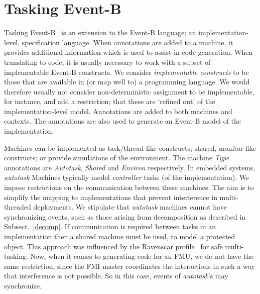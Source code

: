\documentclass{llncs}%
\begin{document}
\section{Tasking Event-B}\label{TEB}
Tasking Event-B~\cite{ae2011a} is an extension to the Event-B language; an implementation-level, specification language. When annotations are added to a machine, it provides additional information which is used to assist in code generation. When translating to code, it is usually necessary to work with a subset of implementable Event-B constructs. We consider \emph{implementable constructs} to be those that are available in (or map well to) a programming language. We would therefore usually not consider non-deterministic assignment to be implementable, for instance, and add a restriction; that these are `refined out' of the implementation-level model. Annotations are added to both machines and contexts. The annotations are also used to generate an Event-B model of the implementation. 

Machines can be implemented as task/thread-like constructs; shared, monitor-like constructs; or provide simulations of the environment.  The machine \emph{Type} annotations are \emph{Autotask}, \emph{Shared} and \emph{Environ} respectively.  In embedded systems, \emph{autotask} Machines typically model \emph{controller} tasks (of the implementation). We impose restrictions on the communication between these machines. The aim is to simplify the mapping to implementations that prevent interference in multi-threaded deployments. We stipulate that \emph{autotask} machines cannot have synchronizing events, such as those arising from decomposition as described in Subsect.~\ref{decomp}. If communication is required between tasks in an implementation then a shared machine must be used, to model a protected object. This approach was influenced by the Ravenscar profile~\cite{Burns1999} for safe multi-tasking. Now, when it comes to generating code for an FMU, we do not have the same restriction, since the FMI master coordinates the interactions in such a way that interference is not possible. So in this case, events of \emph{autotask}'s may synchronize.
\end{document}
